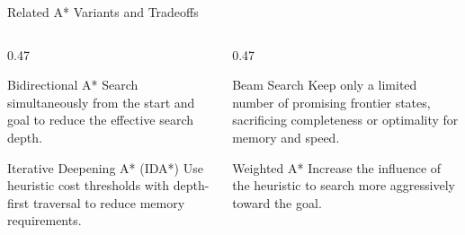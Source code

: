 \documentclass[aspectratio=169,10pt]{beamer}
\begin{document}
\begin{frame}[shrink=20]{Related A* Variants and Tradeoffs}
  \begin{columns}[T,onlytextwidth]
    \begin{column}{0.47\textwidth}
      \begin{block}{Bidirectional A*}
        Search simultaneously from the start and goal to reduce the effective search depth.
      \end{block}

      \begin{block}{Iterative Deepening A* (IDA*)}
        Use heuristic cost thresholds with depth-first traversal to reduce memory requirements.
      \end{block}
    \end{column}

    \begin{column}{0.47\textwidth}
      \begin{block}{Beam Search}
        Keep only a limited number of promising frontier states, sacrificing completeness or optimality for memory and speed.
      \end{block}

      \begin{block}{Weighted A*}
        Increase the influence of the heuristic to search more aggressively toward the goal.
      \end{block}
    \end{column}
  \end{columns}
\end{frame}
\end{document}
